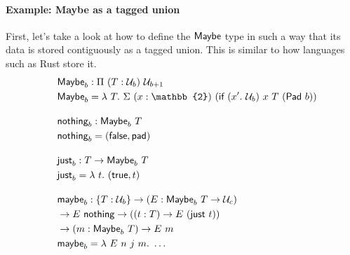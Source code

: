 \paragraph{Example: Maybe as a tagged union}\label{maybe-as-a-tagged-union}

First, let's take a look at how to define the \(\textsf{Maybe}\) type in
such a way that its data is stored contiguously as a tagged union. This
is similar to how languages such as Rust store it. \[
\begin{aligned}
&\syn{Maybe}_b : \Pi\ (T : \univ_b)\ \univ_{b + 1} \\
&\syn{Maybe}_b = \lambda\ T.\
\Sigma\ (x : \mathbb{2})\ (\syn{if}\ (x'.\ \univ_b)\ x\ T\ (\syn{Pad}\ b)) \\[1em]
&\syn{nothing}_b : \syn{Maybe}_b\ T \\
&\syn{nothing}_b = (\syn{false}, \syn{pad}) \\[1em]
&\syn{just}_b : T \to \syn{Maybe}_b\ T \\
&\syn{just}_b = \lambda\ t.\  (\syn{true}, t) \\[1em]
&\syn{maybe}_b : \{T : \univ_b\} \to (E : \syn{Maybe}_b\ T \to  \univ_c) \\
\quad & \to E\ \syn{nothing} \to ((t : T) \to E\ (\syn{just}\ t)) \\
\quad & \to (m : \syn{Maybe}_b\ T) \to E\ m \\
&\syn{maybe}_b = \lambda\ E\ n\ j\ m.\ \ldots
\end{aligned}
\]
